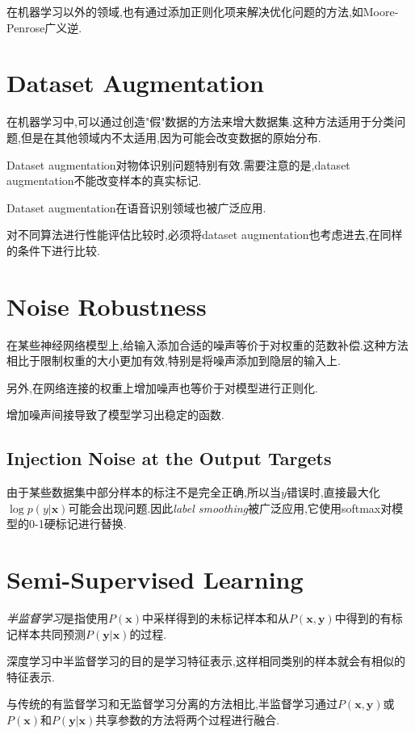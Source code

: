 在机器学习以外的领域,也有通过添加正则化项来解决优化问题的方法,如Moore-Penrose广义逆.

\section{Dataset Augmentation}

在机器学习中,可以通过创造"假"数据的方法来增大数据集.这种方法适用于分类问题,但是在其他领域内不太适用,因为可能会改变数据的原始分布.

Dataset augmentation对物体识别问题特别有效.需要注意的是,dataset augmentation不能改变样本的真实标记.

Dataset augmentation在语音识别领域也被广泛应用.

对不同算法进行性能评估比较时,必须将dataset augmentation也考虑进去,在同样的条件下进行比较.

\section{Noise Robustness}

在某些神经网络模型上,给输入添加合适的噪声等价于对权重的范数补偿.这种方法相比于限制权重的大小更加有效,特别是将噪声添加到隐层的输入上.

另外,在网络连接的权重上增加噪声也等价于对模型进行正则化.

增加噪声间接导致了模型学习出稳定的函数.

\subsection{Injection Noise at the Output Targets}

由于某些数据集中部分样本的标注不是完全正确,所以当$y$错误时,直接最大化$\log p(y|\mathbf x)$可能会出现问题.因此\textit{label smoothing}被广泛应用,它使用softmax对模型的0-1硬标记进行替换.

\section{Semi-Supervised Learning}

\textit{半监督学习}是指使用$P(\mathbf x)$中采样得到的未标记样本和从$P(\mathbf{x, y})$中得到的有标记样本共同预测$P(\mathbf{y|x})$的过程.

深度学习中半监督学习的目的是学习特征表示,这样相同类别的样本就会有相似的特征表示.

与传统的有监督学习和无监督学习分离的方法相比,半监督学习通过$P(\mathbf{x,y})$或$P(\mathbf x)$和$P(\mathbf{y|x})$共享参数的方法将两个过程进行融合.

